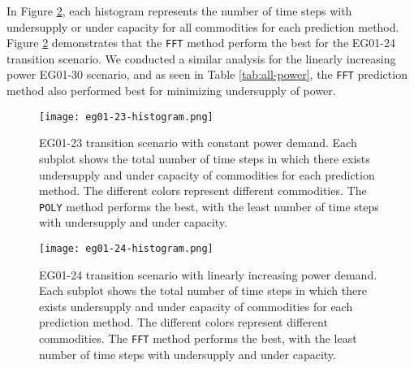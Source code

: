 In Figure \ref{fig:eg24under}, each histogram represents 
the number of time steps with undersupply or 
under capacity for all commodities for each prediction method.  
Figure \ref{fig:eg24under} demonstrates that the \texttt{FFT} method 
perform the best for the EG01-24 transition scenario.
We conducted a similar analysis for the linearly increasing power 
EG01-30 scenario, and 
as seen in Table \ref{tab:all-power}, the \texttt{FFT} prediction method 
also performed best for minimizing undersupply of power. 

\begin{figure}[]
	\centering
	\texttt{[image: eg01-23-histogram.png]} 
	\caption{
	EG01-23 transition scenario with constant power demand. 
	Each subplot shows the total number of time steps in which there exists 
	undersupply and under capacity of commodities for each prediction method. 
	The different colors represent different commodities.
	The \texttt{POLY} method performs the best, with the least number of 
	time steps with undersupply and under capacity.}
	\label{fig:eg23under}
\end{figure}

\begin{figure}[]
	\centering
	\texttt{[image: eg01-24-histogram.png]} 
	\caption{
	EG01-24 transition scenario with linearly increasing power demand. 
	Each subplot shows the total number of time steps in which there exists 
	undersupply and under capacity of commodities for each prediction method. 
	The different colors represent different commodities.
	The \texttt{FFT} method performs the best, with the least number of 
	time steps with undersupply and under capacity.}
	\label{fig:eg24under}
\end{figure}

